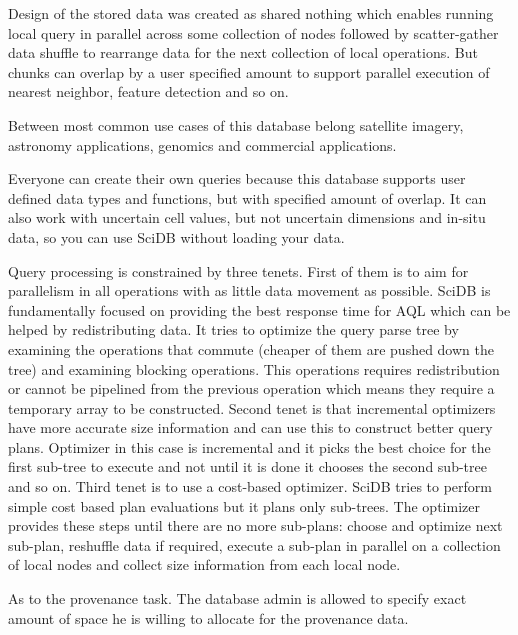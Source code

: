 Design of the stored data was created as shared nothing which enables running local query in parallel across some collection of nodes followed by scatter-gather data shuffle to rearrange data for the next collection of local operations. But chunks can overlap by a user specified amount to support parallel execution of nearest neighbor, feature detection and so on.

Between most common use cases of this database belong satellite imagery, astronomy applications, genomics and commercial applications.

Everyone can create their own queries because this database supports user defined data types and functions, but with specified amount of overlap. It can also work with uncertain cell values, but not uncertain dimensions and in-situ data, so you can use SciDB without loading your data.

Query processing is constrained by three tenets.
First of them is to aim for parallelism in all operations with as little data movement as possible. SciDB is fundamentally focused on providing the best response time for AQL which can be helped by redistributing data. It tries to optimize the query parse tree by examining the operations that commute (cheaper of them are pushed down the tree) and examining blocking operations. This operations requires redistribution or cannot be pipelined from the previous operation which means they require a temporary array to be constructed.
Second tenet is that incremental optimizers have more accurate size information and can use this to construct better query plans. Optimizer in this case is incremental and it picks the best choice for the first sub-tree to execute and not until it is done it chooses the second sub-tree and so on.
Third tenet is to use a cost-based optimizer. SciDB tries to perform simple cost based plan evaluations but it plans only sub-trees. The optimizer provides these steps until there are no more sub-plans: choose and optimize next sub-plan, reshuffle data if required, execute a sub-plan in parallel on a collection of local nodes and collect size information from each local node.

As to the provenance task. The database admin is allowed to specify exact amount of space he is willing to allocate for the provenance data. \cite{scidbarch}

